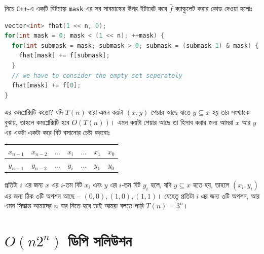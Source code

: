নিচে \texttt{C++}-এ
একটি বিটমাস্ক \texttt{mask} এর সব সাবমাস্কের উপর ইটারেট করে $\hat{f}$
ক্যাল্কুলেট করার কোড দেওয়া হলোঃ
\begin{lstlisting}[language=C++]
vector<int> fhat(1 << n, 0);
for(int mask = 0; mask < (1 << n); ++mask) {
  for(int submask = mask; submask > 0; submask = (submask-1) & mask) {
    fhat[mask] += f[submask];
  }
  // we have to consider the empty set seperately
  fhat[mask] += f[0];
}
\end{lstlisting}
এর কমপ্লেক্সিটি কতো? যদি $T(n)$ দ্বারা এমন কয়টা $(x, y)$ পেয়ার আছে যাতে $y
\subseteq x$ হয় তার সংখ্যাকে বুঝায়, তাহলে কমপ্লেক্সিটি হবে $O(T(n))$। এমন
কয়টা পেয়ার আছে তা হিসাব করার জন্য আমরা $x$ আর $y$ এর একটা একটা করে বিট বসানোর
চেষ্টা করবোঃ
\begin{center}
  \begin{tabular}{|c|c|c|c|c|c|c|}
    \hline
    $x_{n-1}$ & $x_{n-2}$ & $\dots$ & $x_i$ & $\dots$ & $x_{1}$ & $x_{0}$\\
    \hline
    $y_{n-1}$ & $y_{n-2}$ & $\dots$ & $y_i$ & $\dots$ & $y_{1}$ & $y_{0}$\\
    \hline
  \end{tabular}
\end{center}
প্রতিটা $i$ এর জন্য $x$ এর $i$-তম বিট $x_i$ এবং $y$ এর $i$-তম বিট $y_i$ হলে,
যদি $y \subseteq x$ হতে হয়, তাহলে $(x_i, y_i)$ এর জন্য ঠিক ৩টি অপশন আছে --
$(0, 0), (1, 0), (1, 1)$। যেহেতু প্রতিটা $i$ এর জন্য ৩টি অপশন, আর এমন
সিদ্ধান্ত আমাদের $n$ বার নিতে হবে তাই আমরা বলতে পারি $T(n) = 3^n$।

\section{\texorpdfstring{$O(n2^n)$}{O(n pow(2, n))} ডিপি সলিউশন}

